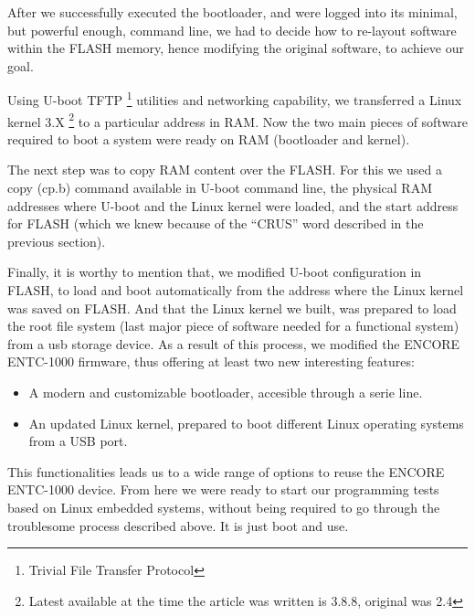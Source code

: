 \documentclass[conference]{IEEEtran}
\begin{document}
After we successfully executed the bootloader, and were
logged into its minimal, but powerful enough, command line,
we had to decide how to re-layout software within the FLASH
memory, hence modifying the original software, to achieve our
goal.

Using U-boot TFTP \footnote{Trivial File Transfer Protocol} utilities and networking capability, we
transferred a Linux kernel 3.X \footnote{Latest available at the time the article was written is 3.8.8, original was 2.4} to a particular address in RAM.
Now the two main pieces of software required to boot a system
were ready on RAM (bootloader and kernel).

The next step was to copy RAM content over the FLASH.
For this we used a copy (cp.b) command available in U-boot command line, the physical RAM addresses where U-boot and the Linux kernel were loaded, and the start address for FLASH (which we knew because of the “CRUS” word described in the previous section).

Finally, it is worthy to mention that, we modified U-boot configuration in FLASH, to load and boot automatically from the 
address where the Linux kernel was saved on FLASH. And that 
the Linux kernel we built, was prepared to load the root file 
system (last major piece of software needed for a functional 
system) from a usb storage device. 
As a result of this process, we modified the ENCORE
ENTC-1000 firmware, thus offering at least two new interesting features:

\begin{itemize}
\item A modern and customizable bootloader, accesible through a serie line.
\item An updated Linux kernel, prepared to boot different
   Linux operating systems from a USB port.
\end{itemize}

This functionalities leads us to a wide range of options to
reuse the ENCORE ENTC-1000 device. From here we were
ready to start our programming tests based on Linux embedded
systems, without being required to go through the troublesome
process described above. It is just boot and use.








\end{document}
